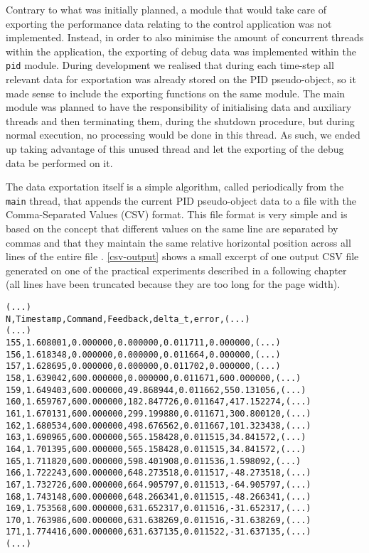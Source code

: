 Contrary to what was initially planned, a module that would take care of exporting the performance data relating to the control application was not implemented.
Instead, in order to also minimise the amount of concurrent threads within the application, the exporting of debug data was implemented within the \verb|pid| module.
During development we realised that during each time-step all relevant data for exportation was already stored on the PID pseudo-object, so it made sense to include the exporting functions on the same module.
The main module was planned to have the responsibility of initialising data and auxiliary threads and then terminating them, during the shutdown procedure, but during normal execution, no processing would be done in this thread.
As such, we ended up taking advantage of this unused thread and let the exporting of the debug data be performed on it.

The data exportation itself is a simple algorithm, called periodically from the \verb|main| thread, that appends the current PID pseudo-object data to a file with the Comma-Separated Values (CSV) format.
This file format is very simple and is based on the concept that different values on the same line are separated by commas and that they maintain the same relative horizontal position across all lines of the entire file \cite{sw:csv}.
\autoref{csv-output} shows a small excerpt of one output CSV file generated on one of the practical experiments described in a following chapter (all lines have been truncated because they are too long for the page width).

%
\begin{lstlisting}[float=htp,caption=Excerpt from an experimental data CSV output file,label=csv-output]
(...)
N,Timestamp,Command,Feedback,delta_t,error,(...)
(...)
155,1.608001,0.000000,0.000000,0.011711,0.000000,(...)
156,1.618348,0.000000,0.000000,0.011664,0.000000,(...)
157,1.628695,0.000000,0.000000,0.011702,0.000000,(...)
158,1.639042,600.000000,0.000000,0.011671,600.000000,(...)
159,1.649403,600.000000,49.868944,0.011662,550.131056,(...)
160,1.659767,600.000000,182.847726,0.011647,417.152274,(...)
161,1.670131,600.000000,299.199880,0.011671,300.800120,(...)
162,1.680534,600.000000,498.676562,0.011667,101.323438,(...)
163,1.690965,600.000000,565.158428,0.011515,34.841572,(...)
164,1.701395,600.000000,565.158428,0.011515,34.841572,(...)
165,1.711820,600.000000,598.401908,0.011536,1.598092,(...)
166,1.722243,600.000000,648.273518,0.011517,-48.273518,(...)
167,1.732726,600.000000,664.905797,0.011513,-64.905797,(...)
168,1.743148,600.000000,648.266341,0.011515,-48.266341,(...)
169,1.753568,600.000000,631.652317,0.011516,-31.652317,(...)
170,1.763986,600.000000,631.638269,0.011516,-31.638269,(...)
171,1.774416,600.000000,631.637135,0.011522,-31.637135,(...)
(...)
\end{lstlisting}

